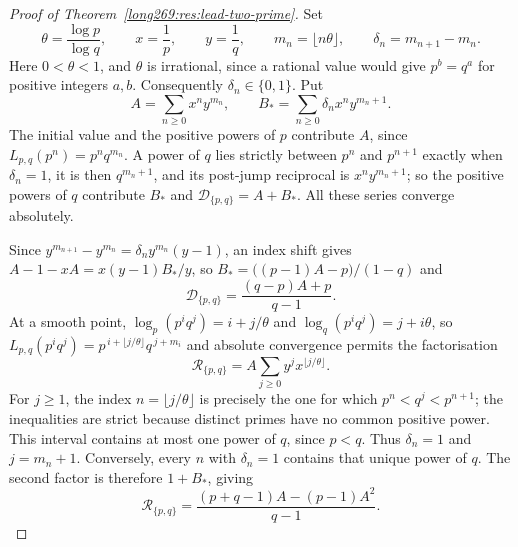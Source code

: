 \documentclass[11pt]{article}
\theoremstyle{remark}
\theoremstyle{plain}
\begin{document}
\begin{proof}[Proof of Theorem~\ref{long269:res:lead-two-prime}]
Set
\[
 \theta=\frac{\log p}{\log q},\qquad x=\frac1p,\qquad y=\frac1q,\qquad
 m_n=\lfloor n\theta\rfloor,\qquad \delta_n=m_{n+1}-m_n .
\]
Here $0<\theta<1$, and $\theta$ is irrational, since a rational value would
give $p^{b}=q^{a}$ for positive integers $a,b$.  Consequently
$\delta_n\in\{0,1\}$.  Put
\[
 A=\sum_{n\ge0}x^ny^{m_n},
 \qquad
 B_\ast=\sum_{n\ge0}\delta_nx^ny^{m_n+1} .
\]
The initial value and the positive powers of $p$ contribute $A$, since
$L_{p,q}(p^n)=p^nq^{m_n}$.  A power of $q$ lies strictly between $p^n$ and
$p^{n+1}$ exactly when $\delta_n=1$, it is then $q^{m_n+1}$, and its post-jump
reciprocal is $x^ny^{m_n+1}$; so the positive powers of $q$ contribute $B_\ast$ and
$\mathcal D_{\{p,q\}}=A+B_\ast$.  All these series converge absolutely.

Since $y^{m_{n+1}}-y^{m_n}=\delta_ny^{m_n}(y-1)$, an index shift gives
$A-1-xA=x(y-1)B_\ast/y$, so $B_\ast=\bigl((p-1)A-p\bigr)/(1-q)$ and
\begin{equation}\label{long269:eq:two-prime-affine}
 \mathcal D_{\{p,q\}}=\frac{(q-p)A+p}{q-1} .
\end{equation}
At a smooth point, $\log_p(p^iq^j)=i+j/\theta$ and
$\log_q(p^iq^j)=j+i\theta$, so
$L_{p,q}(p^iq^j)=p^{\,i+\lfloor j/\theta\rfloor}q^{\,j+m_i}$ and absolute
convergence permits the factorisation
\[
 \mathcal R_{\{p,q\}}=A\sum_{j\ge0}y^jx^{\lfloor j/\theta\rfloor}.
\]
For $j\ge1$, the index $n=\lfloor j/\theta\rfloor$ is precisely the one
for which $p^n<q^j<p^{n+1}$; the inequalities are strict because distinct
primes have no common positive power.  This interval contains at most one
power of $q$, since $p<q$.  Thus $\delta_n=1$ and $j=m_n+1$.
Conversely, every $n$ with $\delta_n=1$ contains that unique power of $q$.
The second factor is therefore $1+B_\ast$, giving
\begin{equation}\label{long269:eq:two-prime-quadratic}
 \mathcal R_{\{p,q\}}
 =\frac{(p+q-1)A-(p-1)A^{2}}{q-1} .
\end{equation}


\end{proof}
\end{document}
